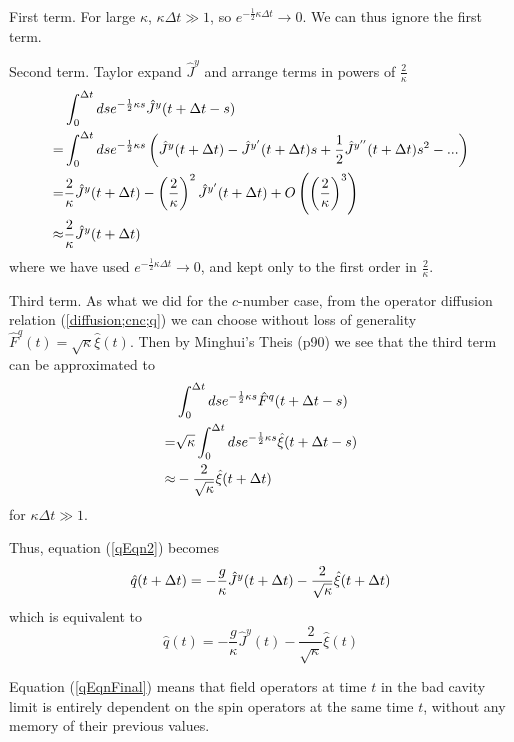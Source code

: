 \documentclass{article}
\begin{document}
First term. For large $\kappa$, $\kappa \Delta t \gg 1$, so $e^{-\frac{1}{2}\kappa \Delta t}\rightarrow 0$. We can thus ignore the first term.

Second term. Taylor expand $\hat{J}^y$ and arrange terms in powers of $\frac{2}{\kappa}$
\begin{align}
    \notag &\int_0^{\Delta t} ds e^{-\frac{1}{2}\kappa s}\hat{J}^y(t+\Delta t-s)\\
    \notag=&\int_0^{\Delta t} ds e^{-\frac{1}{2}\kappa s}\left(\hat{J}^y(t+\Delta t)-\hat{J}^{y'}(t+\Delta t)s+\frac{1}{2}\hat{J}^{y''}(t+\Delta t)s^2-...\right)\\
    \notag=&\frac{2}{\kappa}\hat{J}^y(t+\Delta t)-\left(\frac{2}{\kappa}\right)^2\hat{J}^{y'}(t+\Delta t)+O\left(\left(\frac{2}{\kappa}\right)^3\right)\\
          \approx&\frac{2}{\kappa}\hat{J}^y(t+\Delta t)
\end{align}
where we have used $e^{-\frac{1}{2}\kappa \Delta t}\rightarrow 0$, and kept only to the first order in $\frac{2}{\kappa}$.

Third term. As what we did for the $c$-number case, from the operator diffusion relation (\ref{diffusion;cnc;q}) we can choose without loss of generality $\hat{F}^q(t) = \sqrt{\kappa}\hat{\xi}(t)$. Then by Minghui's Theis (p90) we see that the third term can be approximated to
\begin{align}
    \notag &\int_0^{\Delta t} ds e^{-\frac{1}{2}\kappa s} \hat{F}^q(t+\Delta t-s)\\
    \notag=&\sqrt{\kappa}\int_0^{\Delta t} ds e^{-\frac{1}{2}\kappa s} \hat{\xi}(t+\Delta t-s)\\
          \approx&-\frac{2}{\sqrt{\kappa}}\hat{\xi}(t+\Delta t)
\end{align}
for $\kappa \Delta t \gg 1$.

Thus, equation (\ref{qEqn2}) becomes
\begin{equation}
    \notag\hat{q}(t+\Delta t) = -\frac{g}{\kappa}\hat{J}^y(t+\Delta t)-\frac{2}{\sqrt{\kappa}}\hat{\xi}(t+\Delta t)
\end{equation}
which is equivalent to 
\begin{equation}
    \label{qEqnFinal}
    \hat{q}(t) = -\frac{g}{\kappa}\hat{J}^y(t)-\frac{2}{\sqrt{\kappa}}\hat{\xi}(t)
\end{equation}

Equation (\ref{qEqnFinal}) means that field operators at time $t$ in the bad cavity limit is entirely dependent on the spin operators at the same time $t$, without any memory of their previous values. 
\end{document}
